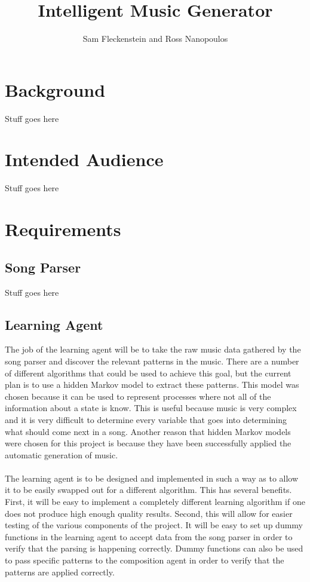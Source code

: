 \documentclass{article}
\begin{document}
\title{Intelligent Music Generator}
\author{Sam Fleckenstein and Ross Nanopoulos}
\maketitle
\newpage

\tableofcontents
\newpage

\section{Background}
Stuff goes here

\section{Intended Audience}
Stuff goes here

\section{Requirements}
\subsection{Song Parser}
Stuff goes here

\subsection{Learning Agent}
The job of the learning agent will be to take the raw music data gathered by the song parser and discover the relevant patterns in the music. There are a number of different algorithms that could be used to achieve this goal, but the current plan is to use a hidden Markov model to extract these patterns. This model was chosen because it can be used to represent processes where not all of the information about a state is know. This is useful because music is very complex and it is very difficult to determine every variable that goes into determining what should come next in a song. Another reason that hidden Markov models were chosen for this project is because they have been successfully applied the automatic generation of music.\\
\\
The learning agent is to be designed and implemented in such a way as to allow it to be easily swapped out for a different algorithm. This has several benefits. First, it will be easy to implement a completely different learning algorithm if one does not produce high enough quality results. Second, this will allow for easier testing of the various components of the project. It will be easy to set up dummy functions in the learning agent to accept data from the song parser in order to verify that the parsing is happening correctly. Dummy functions can also be used to pass specific patterns to the composition agent in order to verify that the patterns are applied correctly.
\end{document}
